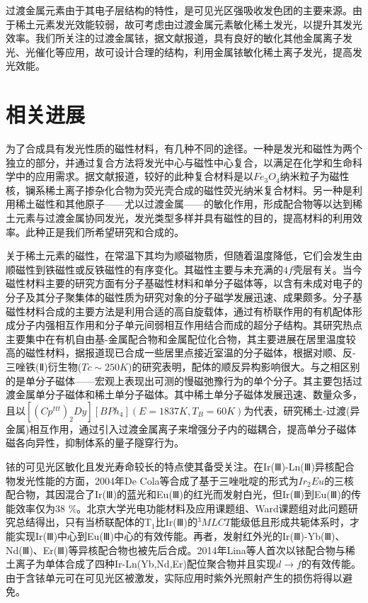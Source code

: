 \documentclass[UTF8,a4paper,10pt,twocolumn]{ctexart}
\begin{document}
过渡金属元素由于其电子层结构的特性，是可见光区强吸收发色团的主要来源。由于稀土元素发光效能较弱，故可考虑由过渡金属元素敏化稀土发光，以提升其发光效率。我们所关注的过渡金属铱，据文献报道，具有良好的敏化其他金属离子发光、光催化等应用，故可设计合理的结构，利用金属铱敏化稀土离子发光，提高发光效能。

\section{相关进展}
为了合成具有发光性质的磁性材料，有几种不同的途径。一种是发光和磁性为两个独立的部分，并通过复合方法将发光中心与磁性中心复合，以满足在化学和生命科学中的应用需求。据文献报道，较好的此种复合材料是以$Fe_3O_4$纳米粒子为磁性核，镧系稀土离子掺杂化合物为荧光壳合成的磁性荧光纳米复合材料。另一种是利用稀土磁性和其他原子——尤以过渡金属——的敏化作用，形成配合物等以达到稀土元素与过渡金属协同发光，发光类型多样并具有磁性的目的，提高材料的利用效率。此种正是我们所希望研究和合成的。

关于稀土元素的磁性，在常温下其均为顺磁物质，但随着温度降低，它们会发生由顺磁性到铁磁性或反铁磁性的有序变化。其磁性主要与未充满的$4f$壳层有关。当今磁性材料主要的研究方面有分子基磁性材料和单分子磁体等，以含有未成对电子的分子及其分子聚集体的磁性质为研究对象的分子磁学发展迅速、成果颇多。分子基磁性材料合成的主要方法是利用合适的高自旋载体，通过有桥联作用的有机配体形成分子内强相互作用和分子单元间弱相互作用结合而成的超分子结构。其研究热点主要集中在有机自由基-金属配合物和金属配位化合物，其主要进展在居里温度较高的磁性材料，据报道现已合成一些居里点接近室温的分子磁体，根据对顺、反-三唑铁(Ⅱ)衍生物($Tc\sim 250K$)的研究表明，配体的顺反异构影响很大。与之相区别的是单分子磁体——宏观上表现出可测的慢磁弛豫行为的单个分子。其主要包括过渡金属单分子磁体和稀土单分子磁体。其中稀土单分子磁体发展迅速、数量众多，且以$[(Cp^{ttt})_2Dy][BPh_4](E=1837K, T_B=60K)$为代表，研究稀土-过渡(异金属)相互作用，通过引入过渡金属离子来增强分子内的磁耦合，提高单分子磁体磁各向异性，抑制体系的量子隧穿行为。

铱的可见光区敏化且发光寿命较长的特点使其备受关注。在Ir(Ⅲ)-Ln(Ⅲ)异核配合物发光性能的方面，2004年De Cola等合成了基于三唑吡啶的形式为$Ir_2Eu$的三核配合物，其因混合了Ir(Ⅲ)的蓝光和Eu(Ⅲ)的红光而发射白光，但Ir(Ⅲ)到Eu(Ⅲ)的传能效率仅为38 \%。北京大学光电功能材料及应用课题组、Ward课题组对此问题研究总结得出，只有当桥联配体的T$_1$比Ir(Ⅲ)的$^3MLCT$能级低且形成共轭体系时，才能实现Ir(Ⅲ)中心到Eu(Ⅲ)中心的有效传能。再者，发射红外光的Ir(Ⅲ)-Yb(Ⅲ)、Nd(Ⅲ)、Er(Ⅲ)等异核配合物也被先后合成。2014年Lina等人首次以铱配合物与稀土离子为单体合成了四种Ir-Ln(Yb,Nd,Er)配位聚合物并且实现$d \rightarrow f$的有效传能。由于含铱单元可在可见光区被激发，实际应用时紫外光照射产生的损伤将得以避免。
\end{document}
